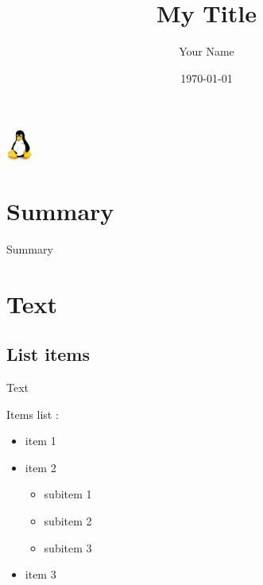 \documentclass[aspectratio=43]{beamer}
\title{{My Title}}
\author{Your Name}
\institute{\href{http://www.mysite.com}{{\textcolor{blue}{www.mysite.com}}}}
\date{\today}
\begin{document}

\begin{frame}[plain]
 
\titlepage
{}
\begin{center}
\includegraphics[height=10mm]{images/my_logo.png}
\end{center}
 
\end{frame}


\section*{Summary}
 

\begin{frame}[shrink]{Summary}

\tableofcontents[hideallsubsections]
 
\end{frame}


\section{Text}


\subsection{List items}
\begin{frame}{Text}

Items list :
\begin{itemize}
\item item 1
\item item 2
	\begin{itemize}
	\item subitem 1
	\item subitem 2
	\item subitem 3
	\end{itemize}
\item item 3
\end{itemize}
 
\end{frame}
 
\end{document}
